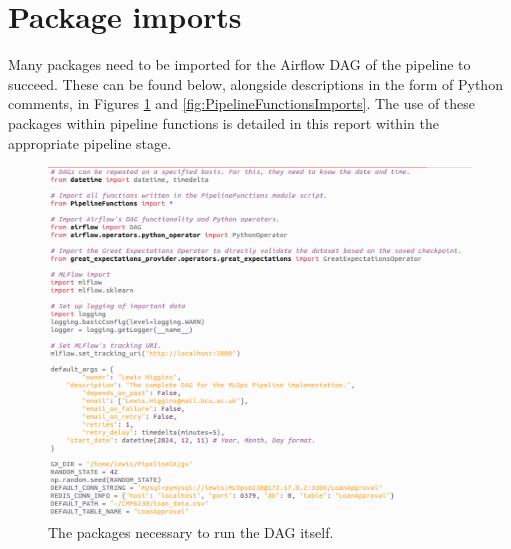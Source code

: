 \documentclass[12pt]{report}
\begin{document}


\section{Package imports}
Many packages need to be imported for the Airflow DAG of the pipeline to succeed. These can be found 
below, alongside descriptions in the form of Python comments, in Figures \ref{fig:PipelineDAGImports} and 
\ref{fig:PipelineFunctionsImports}. The use of these packages within pipeline functions is detailed 
in this report within the appropriate pipeline stage.

\begin{figure}[H]
    \centering
    \includegraphics[width=\linewidth]{Implementation/.Code/PipelineDAGImports.png}
    \caption{The packages necessary to run the DAG itself.}
    \label{fig:PipelineDAGImports}
\end{figure}
\end{document}

